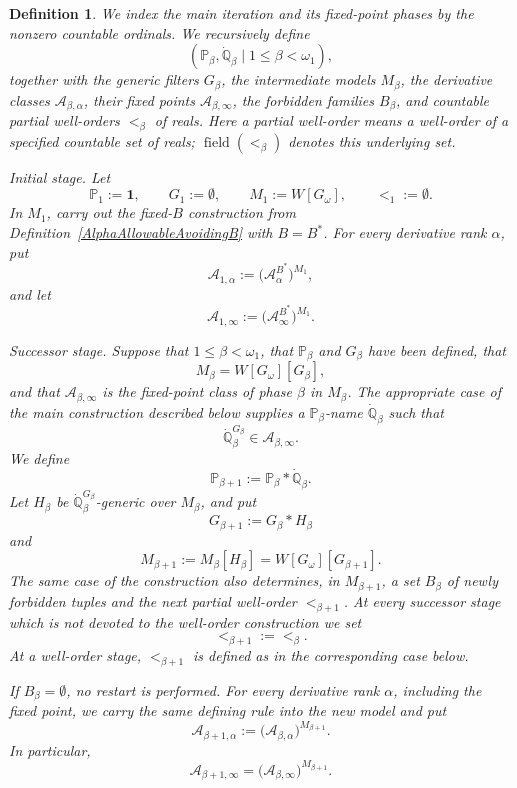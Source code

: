 \documentclass[a4paper,11pt]{article}
\newtheorem{definition}[theorem]{Definition}
\newcommand{\forceP}{\mathbb{P}}
\newcommand{\forceQ}{\mathbb{Q}}
\begin{document}
\begin{definition}\label{MainStopAndGoRecursion}
We index the main iteration and its fixed-point phases by the nonzero countable ordinals. We recursively define
\[
(\forceP_\beta,\dot{\forceQ}_\beta\mid 1\leq\beta<\omega_1),
\]
together with the generic filters $G_\beta$, the intermediate models $M_\beta$, the derivative classes $\mathcal A_{\beta,\alpha}$, their fixed points $\mathcal A_{\beta,\infty}$, the forbidden families $B_\beta$, and countable partial well-orders $<_\beta$ of reals. Here a partial well-order means a well-order of a specified countable set of reals; $\operatorname{field}(<_\beta)$ denotes this underlying set.

\smallskip
\noindent
\emph{Initial stage.}
Let
\[
\forceP_1:=\mathbf 1,\qquad G_1:=\emptyset,\qquad M_1:=W[G_\omega],
\qquad <_1:=\emptyset.
\]
In $M_1$, carry out the fixed-$B$ construction from
Definition~\ref{AlphaAllowableAvoidingB} with $B=B^*$. For every
derivative rank $\alpha$, put
\[
\mathcal A_{1,\alpha}:=
\bigl(\mathcal A^{B^*}_\alpha\bigr)^{M_1},
\]
and let
\[
\mathcal A_{1,\infty}:=
\bigl(\mathcal A^{B^*}_\infty\bigr)^{M_1}.
\]

\smallskip
\noindent
\emph{Successor stage.}
Suppose that $1\leq\beta<\omega_1$, that $\forceP_\beta$ and $G_\beta$ have been defined, that
\[
M_\beta=W[G_\omega][G_\beta],
\]
and that $\mathcal A_{\beta,\infty}$ is the fixed-point class of phase $\beta$ in $M_\beta$. The appropriate case of the main construction described below supplies a $\forceP_\beta$-name $\dot{\forceQ}_\beta$ such that
\[
\dot{\forceQ}_\beta^{G_\beta}\in\mathcal A_{\beta,\infty}.
\]
We define
\[
\forceP_{\beta+1}:=\forceP_\beta*\dot{\forceQ}_\beta.
\]
Let $H_\beta$ be $\dot{\forceQ}_\beta^{G_\beta}$-generic over $M_\beta$, and put
\[
G_{\beta+1}:=G_\beta*H_\beta
\]
and
\[
M_{\beta+1}:=M_\beta[H_\beta]
=W[G_\omega][G_{\beta+1}].
\]
The same case of the construction also determines, in $M_{\beta+1}$, a set $B_\beta$ of newly forbidden tuples and the next partial well-order $<_{\beta+1}$. At every successor stage which is not devoted to the well-order construction we set
\[
<_{\beta+1}:=<_\beta.
\]
At a well-order stage, $<_{\beta+1}$ is defined as in the corresponding case below.

If $B_\beta=\emptyset$, no restart is performed. For every derivative rank $\alpha$, including the fixed point, we carry the same defining rule into the new model and put
\[
\mathcal A_{\beta+1,\alpha}
:=\bigl(\mathcal A_{\beta,\alpha}\bigr)^{M_{\beta+1}}.
\]
In particular,
\[
\mathcal A_{\beta+1,\infty}
=\bigl(\mathcal A_{\beta,\infty}\bigr)^{M_{\beta+1}}.
\]


\end{definition}
\end{document}
